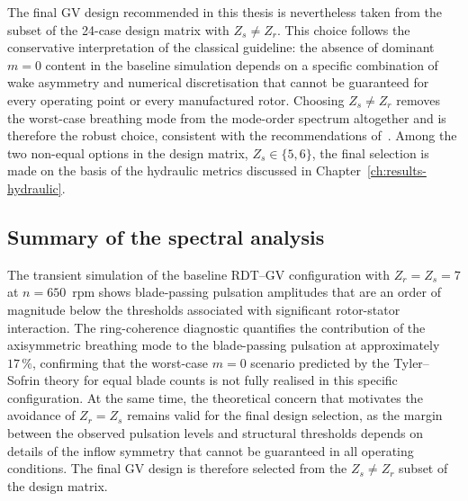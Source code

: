 The final GV design recommended in this thesis is nevertheless
taken from the subset of the 24-case design matrix with
$Z_s \neq Z_r$. This choice follows the conservative interpretation
of the classical guideline: the absence of dominant $m=0$ content
in the baseline simulation depends on a specific combination of
wake asymmetry and numerical discretisation that cannot be
guaranteed for every operating point or every manufactured rotor.
Choosing $Z_s \neq Z_r$ removes the worst-case breathing mode from
the mode-order spectrum altogether and is therefore the robust
choice, consistent with the recommendations
of~\cite{Brekke2015,Brekke2010,Nduwayezu2021}. Among the two non-equal
options in the design matrix, $Z_s \in \{5, 6\}$, the final
selection is made on the basis of the hydraulic metrics discussed
in Chapter~\ref{ch:results-hydraulic}.
 
\subsection{Summary of the spectral analysis}
\label{sec:results-fft-summary2}
 
The transient simulation of the baseline RDT--GV
configuration with $Z_r = Z_s = 7$ at $n = 650$~rpm shows
blade-passing pulsation amplitudes that are an order of magnitude
below the thresholds associated with significant rotor-stator
interaction. The ring-coherence diagnostic quantifies the
contribution of the axisymmetric breathing mode to the
blade-passing pulsation at approximately $17\,\%$, confirming that
the worst-case $m=0$ scenario predicted by the Tyler--Sofrin theory
for equal blade counts is not fully realised in this specific
configuration. At the same time, the theoretical concern that
motivates the avoidance of $Z_r = Z_s$ remains valid for the final
design selection, as the margin between the observed pulsation
levels and structural thresholds depends on details of the inflow
symmetry that cannot be guaranteed in all operating conditions. The
final GV design is therefore selected from the
$Z_s \neq Z_r$ subset of the design matrix.
 


\clearpage %